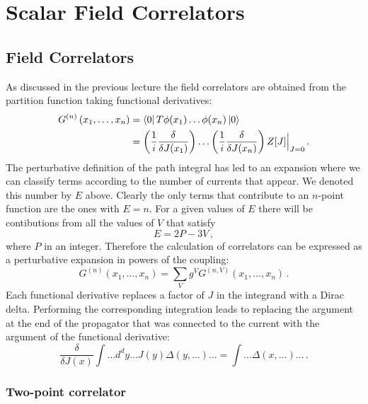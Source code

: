 \documentclass[notes]{subfiles}
\begin{document}
\chapter{Scalar Field Correlators}
\label{cha:scal-field-corr}

\section{Field Correlators}
\label{sec:field-correlators}

As discussed in the previous lecture the field correlators are
obtained from the partition function taking functional derivatives: 
\begin{align}
  \label{eq:CorrDefnPts}
  G^{(n)}\left(x_1, \ldots, x_n\right) 
  &=
    \bra{0} T \phi(x_1) \ldots \phi(x_n) \ket{0}  \\
  \label{eq:CorrDerivGen}
  &= 
    \left(\frac{1}{i} \frac{\delta}{\delta J(x_1)}\right)
    \ldots
    \left(\frac{1}{i} \frac{\delta}{\delta J(x_n)}\right)
    Z[J]\Big|_{J=0} \, .
\end{align}
The perturbative definition of the path integral has led to an
expansion where we can classify terms according to the number of
currents that appear. We denoted this number by $E$ above. Clearly the
only terms that contribute to an $n$-point function are the ones with
$E=n$. For a given values of $E$ there will be contibutions from all
the values of $V$ that satisfy
\[
  E =2P- 3V\, ,
\]
where $P$ in an integer. Therefore the calculation of correlators can
be expressed as a perturbative expansion in powers of the coupling:
\begin{equation}
  \label{eq:CorrPertTh}
  G^{(n)}\left(x_1, \ldots, x_n\right) = 
  \sum_V g^V G^{(n,V)} \left(x_1, \ldots, x_n\right) \, .
\end{equation}
Each functional derivative replaces a factor
of $J$ in the integrand with a Dirac delta. Performing the
corresponding integration leads to replacing the argument at the end
of the propagator that was connected to the current with the argument
of the functional derivative:
\begin{equation}
  \label{eq:DeltaReplace}
  \frac{\delta}{\delta J(x)} \int \ldots d^dy \ldots J(y) \Delta(y,
  \ldots) \ldots =  \int \ldots \Delta(x,\ldots) \ldots\, .
\end{equation}

\subsection{Two-point correlator}
\label{sec:two-point-correlator}
\end{document}
